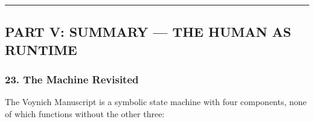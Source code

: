 \documentclass[12pt,a4paper]{article}
\begin{document}
\begin{center}\rule{0.5\linewidth}{0.5pt}\end{center}

\hypertarget{part-v-summary-the-human-as-runtime}{%
\subsection{PART V: SUMMARY --- THE HUMAN AS
RUNTIME}\label{part-v-summary-the-human-as-runtime}}

\hypertarget{the-machine-revisited}{%
\subsubsection{23. The Machine Revisited}\label{the-machine-revisited}}

The Voynich Manuscript is a symbolic state machine with four components,
none of which functions without the other three:
\end{document}
